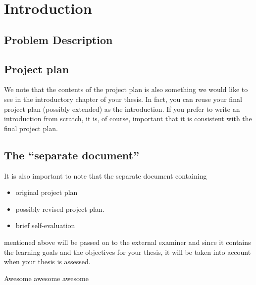 \chapter{Introduction}



\section{Problem Description}




\section{Project plan}
We note that the contents of the project plan is also something we would like to see in the introductory chapter of your thesis. In fact, you can reuse your final project plan (possibly extended) as the introduction. If you prefer to write an introduction from scratch, it is, of course, important that it is consistent with the final project plan.



\section{The ``separate document''}
It is also important to note that the separate document containing
\begin{itemize}
\item original project plan
\item possibly revised project plan. 
\item brief self-evaluation
\end{itemize}

mentioned above will be passed on to the external examiner and since it contains the learning goals and the objectives for your thesis, it will be taken into account when your thesis is assessed. 

Awesome awesome awesome

